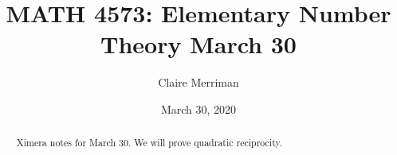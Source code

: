 \documentclass{xourse}
\title{MATH 4573: Elementary Number Theory March 30}
\author{Claire Merriman}
\date{March 30, 2020}
\begin{document}
  
\begin{abstract} %
Ximera notes for March 30. We will prove quadratic reciprocity.
\end{abstract}  
\maketitle 
 
 
\end{document}
